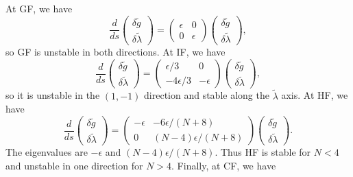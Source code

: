 \begin{solution}
     At GF, we have
     \begin{equation}
         \frac{d}{ds}\begin{pmatrix}
             \delta \tilde g \\ \delta \tilde \lambda
         \end{pmatrix} = \begin{pmatrix}
             \epsilon & 0 \\0 & \epsilon
         \end{pmatrix}\begin{pmatrix}
             \delta \tilde g \\ \delta \tilde \lambda
         \end{pmatrix},
    \end{equation}
    so GF is unstable in both directions.
    At IF, we have
    \begin{equation}
                 \frac{d}{ds}\begin{pmatrix}
             \delta \tilde g \\ \delta \tilde \lambda
         \end{pmatrix} = \begin{pmatrix}
             \epsilon/3 & 0 \\-4\epsilon/3 & -\epsilon
         \end{pmatrix}\begin{pmatrix}
             \delta \tilde g \\ \delta \tilde \lambda
         \end{pmatrix},
    \end{equation}
    so it is unstable in the $(1,-1)$ direction and stable along the $\tilde\lambda$ axis.
    At HF, we have
        \begin{equation}
                 \frac{d}{ds}\begin{pmatrix}
             \delta \tilde g \\ \delta \tilde \lambda
         \end{pmatrix} = \begin{pmatrix}
             -\epsilon & -6\epsilon/(N+8) \\0 & (N-4)\epsilon/(N+8)
         \end{pmatrix}\begin{pmatrix}
             \delta \tilde g \\ \delta \tilde \lambda
         \end{pmatrix}.
    \end{equation}
    The eigenvalues are $-\epsilon$ and $(N-4)\epsilon/(N+8)$. Thus HF is stable for $N<4$ and unstable in one direction for $N>4$. Finally, at CF, we have

\end{solution}
